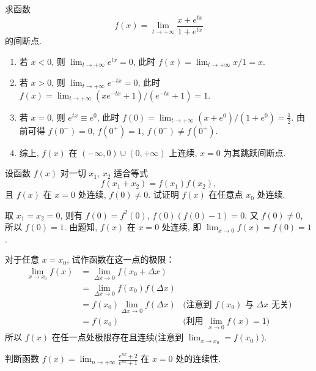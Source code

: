 \begin{exercise}
    求函数
    \[
    f(x) = \lim_{t \to +\infty} \frac{x + e^{tx}}{1 + e^{tx}}
    \]
    的间断点. 
\end{exercise}

\begin{solution}
    \begin{enumerate}
        \item 若 $x < 0$, 则 $\lim_{t \to +\infty} e^{tx} = 0$, 此时 $f(x) = \lim_{t \to +\infty} x/1 = x$.
        \item 若 $x > 0$, 则 $\lim_{t \to +\infty} e^{-tx} = 0$, 此时 $f(x) = \lim_{t \to +\infty} (xe^{-tx} + 1)/(e^{-tx} + 1) = 1$.
        \item 若 $x = 0$, 则 $e^{tx} \equiv e^0$, 此时 $f(0) = \lim_{t \to +\infty} (x + e^0)/(1 + e^0) = \frac 12$. 由前可得 $f(0^-) = 0$, $f(0^+) = 1$, $f(0^-) \neq f(0^+)$.
        \item 综上, $f(x)$ 在 $(-\infty, 0) \cup (0, +\infty)$ 上连续, $x = 0$ 为其跳跃间断点. 
    \end{enumerate}
\end{solution}

\begin{exercise}
    设函数 $f(x)$ 对一切 $x_1$, $x_2$ 适合等式
    \[
    f(x_1 + x_2) = f(x_1)f(x_2),
    \]
    且 $f(x)$ 在 $x = 0$ 处连续, $f(0) \neq 0$. 试证明 $f(x)$ 在任意点 $x_0$ 处连续. 
\end{exercise}

\begin{solution}
    取 $x_1 = x_2 = 0$, 则有 $f(0) = f^2(0)$,  $f(0)(f(0) - 1) = 0$. 又 $f(0) \neq 0$, 所以 $f(0) = 1$. 由题知, $f(x)$ 在 $x = 0$ 处连续, 即 $\lim_{x \to 0} f(x) = f(0) = 1$.
    
    对于任意 $x = x_0$, 试作函数在这一点的极限：
    \begin{align*}
    \lim_{x \to x_0} f(x) 
    &= \lim_{\Delta x \to 0} f(x_0 + \Delta x) &\\
    &= \lim_{\Delta x \to 0} f(x_0) f(\Delta x) &\\
    &= f(x_0) \lim_{\Delta x \to 0} f(\Delta x) & \text{(注意到 $f(x_0)$ 与 $\Delta x$ 无关)} \\
    &= f(x_0) & \text{(利用 $\lim_{x \to 0} f(x) = 1$)}
    \end{align*}
    所以 $f(x)$ 在任一点处极限存在且连续(注意到 $\lim_{x \to x_0} = f(x_0)$).
\end{solution}

\begin{exercise}
    判断函数 $\displaystyle f(x) = \lim_{n \to +\infty} \frac{e^{nx} + 2}{e^{nx} + 1}$ 在 $x = 0$ 处的连续性. 
\end{exercise}

